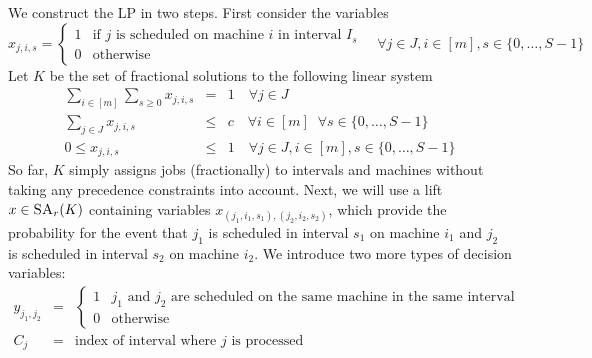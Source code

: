 We construct the LP in two steps. %
First consider the variables
\[
  x_{j,i,s} = \begin{cases} 1 & \textrm{if }j\textrm{ is scheduled on machine }i\textrm{ in interval }I_s \\ 0 & \textrm{otherwise} \end{cases} \quad \forall j \in J, i \in [m], s \in \{ 0,\ldots,S-1\}
\]
Let $K$ be the set of fractional solutions to the following linear system
\begin{eqnarray*}
  \sum_{i \in [m]} \sum_{s \geq 0} x_{j,i,s} &=& 1 \quad \forall j \in J \\
  \sum_{j \in J} x_{j,i,s} &\leq& c \quad \forall i \in [m] \;\; \forall s \in \{ 0,\ldots,S-1\} \\
  0 \leq x_{j,i,s} &\leq& 1 \quad \forall j \in J, i \in [m], s \in \{ 0,\ldots,S-1\}
\end{eqnarray*}
So far, $K$ simply assigns jobs (fractionally) to intervals and machines without taking any precedence  constraints into account. %
Next, we will use a lift $x \in \textsc{SA}_r(K)$ containing variables
$x_{(j_1,i_1,s_1),(j_2,i_2,s_2)}$, which provide the probability for the event that $j_1$ is scheduled in interval $s_1$ on machine $i_1$ and
$j_2$ is scheduled in interval $s_2$ on machine $i_2$. We introduce two more types of decision variables: 
\begin{eqnarray*}
  y_{j_1,j_2} &=& \begin{cases} 1 & j_1\textrm{ and }j_2\textrm{ are scheduled on the same machine in the same interval} \\ 0 & \textrm{otherwise} \end{cases} \\
   C_j &=& \textrm{index of interval where }j\textrm{ is processed}
\end{eqnarray*}
